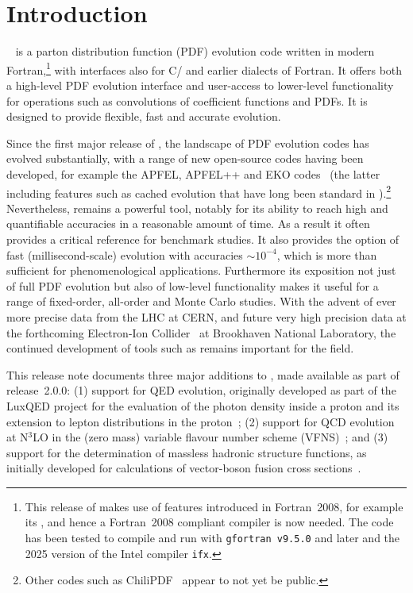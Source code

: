 \documentclass[preprint,1p,a4paper,11pt]{elsarticle}
\begin{document}
\section{Introduction}


\hoppet~\cite{Salam:2008qg} is a parton distribution function (PDF)
evolution code written in modern Fortran,\footnote{This release of
\hoppet makes use of features introduced in Fortran~2008, for example
its , and hence a Fortran~2008 compliant
compiler is now needed. The code has been tested to compile and run
with \texttt{gfortran v9.5.0} and later and the 2025 version of the
Intel compiler \texttt{ifx}.}  with interfaces also for C/\CPP{} and
earlier dialects of Fortran.
%
It offers both a high-level PDF evolution interface and user-access to
lower-level functionality for operations such as convolutions of
coefficient functions and PDFs.
%
It is designed to provide flexible, fast and accurate evolution.

Since the first major release of \hoppet, the landscape of PDF
evolution codes has evolved substantially, with a range of new open-source
codes having been developed, for example the APFEL, APFEL++ and EKO
codes~\cite{} (the latter including
features such as cached evolution that have long been standard in
\hoppet).\footnote{Other codes such as ChiliPDF~\cite{Diehl:2021gvs}
  appear to not yet be public.}
%
Nevertheless, \hoppet remains a powerful tool, notably for its ability
to reach high and quantifiable accuracies in a reasonable amount of
time.
%
As a result it often provides a critical reference for benchmark
studies.
%
It also provides the option of fast (millisecond-scale) evolution with
accuracies $\sim 10^{-4}$, which is more than sufficient for
phenomenological applications.
%
%
Furthermore its exposition not just of full PDF evolution but also of
low-level functionality makes it useful for a range of fixed-order,
all-order and Monte Carlo studies.
%
With the advent of ever more precise data from the LHC at CERN, and
future very high precision data at the forthcoming Electron-Ion
Collider~\cite{AbdulKhalek:2021gbh} at Brookhaven National Laboratory,
the continued development of tools such as \hoppet remains important
for the field.

This release note documents three major additions to \hoppet, made
available as part of release~2.0.0: (1) support for QED evolution,
originally developed as part of the LuxQED project for the evaluation
of the photon density inside a proton and its extension to lepton
distributions in the
proton~\cite{Manohar:2016nzj,Manohar:2017eqh,Buonocore:2020nai,Buonocore:2021bsf};
%
(2) support for QCD evolution at N$^3$LO in the (zero mass) variable
flavour number scheme (VFNS)~\cite{Buza:1996wv};
%
and (3) support for the
determination of massless hadronic structure functions, as initially developed
for calculations of vector-boson fusion cross
sections~\cite{Cacciari:2015jma,Dreyer:2016oyx,Dreyer:2018qbw,Dreyer:2018rfu}.
\end{document}
